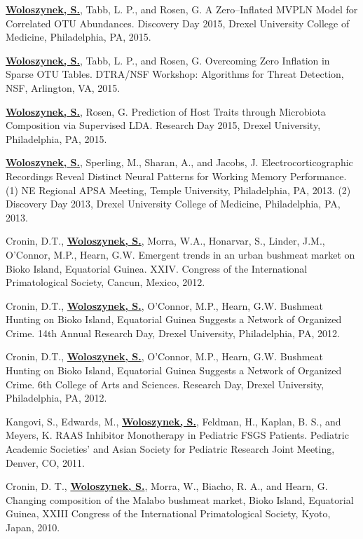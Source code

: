 \begin{cventries}
{\begin{cvitems}
{        \item{\textbf{\underline{Woloszynek, S.}}, Tabb, L. P., and Rosen, G. A Zero–Inflated MVPLN Model for Correlated OTU Abundances. Discovery Day 2015, Drexel University College of Medicine, Philadelphia, PA, 2015.}
        \item{\textbf{\underline{Woloszynek, S.}}, Tabb, L. P., and Rosen, G. Overcoming Zero Inflation in Sparse OTU Tables. DTRA/NSF Workshop: Algorithms for Threat Detection, NSF, Arlington, VA, 2015.}
        \item{\textbf{\underline{Woloszynek, S.}}, Rosen, G. Prediction of Host Traits through Microbiota Composition via Supervised LDA. Research Day 2015, Drexel University, Philadelphia, PA, 2015.}
        \item{\textbf{\underline{Woloszynek, S.}}, Sperling, M., Sharan, A., and Jacobs, J. Electrocorticographic Recordings Reveal Distinct Neural Patterns for Working Memory Performance. (1) NE Regional APSA Meeting, Temple University, Philadelphia, PA, 2013. (2) Discovery Day 2013, Drexel University College of Medicine, Philadelphia, PA, 2013.}
        \item{Cronin, D.T., \textbf{\underline{Woloszynek, S.}}, Morra, W.A., Honarvar, S., Linder, J.M., O’Connor, M.P., Hearn, G.W. Emergent trends in an urban bushmeat market on Bioko Island, Equatorial Guinea. XXIV. Congress of the International Primatological Society, Cancun, Mexico, 2012.}
        \item{Cronin, D.T., \textbf{\underline{Woloszynek, S.}}, O’Connor, M.P., Hearn, G.W. Bushmeat Hunting on Bioko Island, Equatorial Guinea Suggests a Network of Organized Crime. 14th Annual Research Day, Drexel University, Philadelphia, PA, 2012.}
        \item{Cronin, D.T., \textbf{\underline{Woloszynek, S.}}, O’Connor, M.P., Hearn, G.W. Bushmeat Hunting on Bioko Island, Equatorial Guinea Suggests a Network of Organized Crime. 6th College of Arts and Sciences. Research Day, Drexel University, Philadelphia, PA, 2012.}
        \item{Kangovi, S., Edwards, M., \textbf{\underline{Woloszynek, S.}}, Feldman, H., Kaplan, B. S., and Meyers, K. RAAS Inhibitor Monotherapy in Pediatric FSGS Patients. Pediatric Academic Societies' and Asian Society for Pediatric Research Joint Meeting, Denver, CO, 2011.}
        \item{Cronin, D. T., \textbf{\underline{Woloszynek, S.}}, Morra, W., Biacho, R. A., and Hearn, G. Changing composition of the Malabo bushmeat market, Bioko Island, Equatorial Guinea, XXIII Congress of the International Primatological Society, Kyoto, Japan, 2010.}
        }
      \end{cvitems}
    }
    

\end{cventries}
